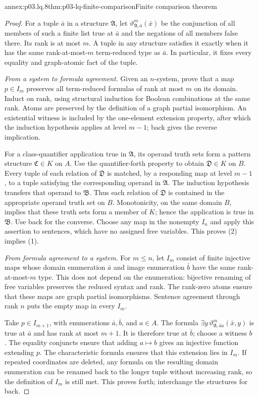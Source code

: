 \begin{annexitem}{annex:p03.lq.8}{thm:p03-lq-finite-comparison}{Finite comparison theorem}
\begin{proof}
For a tuple \(\bar a\) in a structure \(\mathfrak A\), let
\(\vartheta^m_{\mathfrak A,\bar a}(\bar x)\) be the conjunction
of all members of such a finite list true at \(\bar a\) and the
negations of all members false there. Its rank is at most \(m\).
A tuple in any structure satisfies it exactly when it has the same
rank-at-most-\(m\) term-reduced type as \(\bar a\). In particular,
it fixes every equality and graph-atomic fact of the tuple.

\emph{From a system to formula agreement.}
Given an \(n\)-system, prove that a map \(p\in I_m\) preserves
all term-reduced formulas of rank at most \(m\) on its domain.
Induct on rank, using structural induction for Boolean combinations
at the same rank. Atoms are preserved by the definition of a graph
partial isomorphism. An existential witness is included by the
one-element extension property, after which the induction hypothesis
applies at level \(m-1\); back gives the reverse implication.

For a class-quantifier application true in \(\mathfrak A\), its
operand truth sets form a pattern structure \(\mathfrak C\in K\)
on \(A\). Use the quantifier-forth property to obtain
\(\mathfrak D\in K\) on \(B\). Every tuple of each relation of
\(\mathfrak D\) is matched, by a responding map at level \(m-1\),
to a tuple satisfying the corresponding operand in \(\mathfrak A\).
The induction hypothesis transfers that operand to \(\mathfrak B\).
Thus each relation of \(\mathfrak D\) is contained in the appropriate
operand truth set on \(B\). Monotonicity, on the same domain \(B\),
implies that these truth sets form a member of \(K\); hence the
application is true in \(\mathfrak B\). Use back for the converse.
Choose any map in the nonempty \(I_n\) and apply this assertion
to sentences, which have no assigned free variables. This proves
(2) implies (1).

\emph{From formula agreement to a system.}
For \(m\leq n\), let \(I_m\) consist of finite injective maps
whose domain enumeration \(\bar a\) and image enumeration
\(\bar b\) have the same rank-at-most-\(m\) type. This does not
depend on the enumeration: bijective renaming of free variables
preserves the reduced syntax and rank. The rank-zero atoms ensure
that these maps are graph partial isomorphisms. Sentence agreement
through rank \(n\) puts the empty map in every \(I_m\).

Take \(p\in I_{m+1}\), with enumerations \(\bar a,\bar b\),
and \(a\in A\). The formula
\(\exists y\,\vartheta^m_{\mathfrak A,\bar a a}(\bar x,y)\)
is true at \(\bar a\) and has rank at most \(m+1\). It is
therefore true at \(\bar b\); choose a witness \(b\).
The equality conjuncts ensure that adding \(a\mapsto b\) gives
an injective function extending \(p\). The characteristic formula
ensures that this extension lies in \(I_m\). If repeated coordinates
are deleted, any formula on the resulting domain enumeration can
be renamed back to the longer tuple without increasing rank, so
the definition of \(I_m\) is still met. This proves forth;
interchange the structures for back.


\end{proof}
\end{annexitem}
